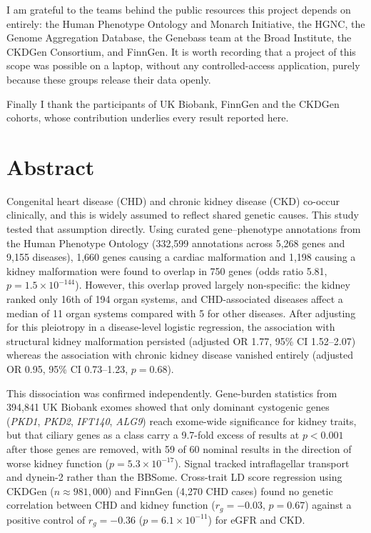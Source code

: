 \documentclass[11pt,a4paper]{article}
\newcommand{\gene}[1]{\textit{#1}}
\begin{document}
I am grateful to the teams behind the public resources this project depends on entirely:
the Human Phenotype Ontology and Monarch Initiative, the HGNC, the Genome Aggregation
Database, the Genebass team at the Broad Institute, the CKDGen Consortium, and FinnGen. It
is worth recording that a project of this scope was possible on a laptop, without any
controlled-access application, purely because these groups release their data openly.

Finally I thank the participants of UK Biobank, FinnGen and the CKDGen cohorts, whose
contribution underlies every result reported here.

\newpage
\section*{Abstract}


Congenital heart disease (CHD) and chronic kidney disease (CKD) co-occur clinically, and
this is widely assumed to reflect shared genetic causes. This study tested that assumption
directly. Using curated gene--phenotype annotations from the Human Phenotype Ontology
(332,599 annotations across 5,268 genes and 9,155 diseases), 1,660 genes causing a cardiac
malformation and 1,198 causing a kidney malformation were found to overlap in 750 genes
(odds ratio 5.81, $p = 1.5 \times 10^{-144}$). However, this overlap proved largely
non-specific: the kidney ranked only 16th of 194 organ systems, and CHD-associated diseases
affect a median of 11 organ systems compared with 5 for other diseases. After adjusting for
this pleiotropy in a disease-level logistic regression, the association with structural
kidney malformation persisted (adjusted OR 1.77, 95\% CI 1.52--2.07) whereas the association
with chronic kidney disease vanished entirely (adjusted OR 0.95, 95\% CI 0.73--1.23,
$p = 0.68$).

This dissociation was confirmed independently. Gene-burden statistics from 394,841 UK Biobank
exomes showed that only dominant cystogenic genes (\gene{PKD1}, \gene{PKD2}, \gene{IFT140},
\gene{ALG9}) reach exome-wide significance for kidney traits, but that ciliary genes as a
class carry a 9.7-fold excess of results at $p < 0.001$ after those genes are removed, with
59 of 60 nominal results in the direction of worse kidney function ($p = 5.3 \times
10^{-17}$). Signal tracked intraflagellar transport and dynein-2 rather than the BBSome.
Cross-trait LD score regression using CKDGen ($n \approx 981{,}000$) and FinnGen
(4,270 CHD cases) found no genetic correlation between CHD and kidney function
($r_g = -0.03$, $p = 0.67$) against a positive control of $r_g = -0.36$
($p = 6.1 \times 10^{-11}$) for eGFR and CKD.
\end{document}
